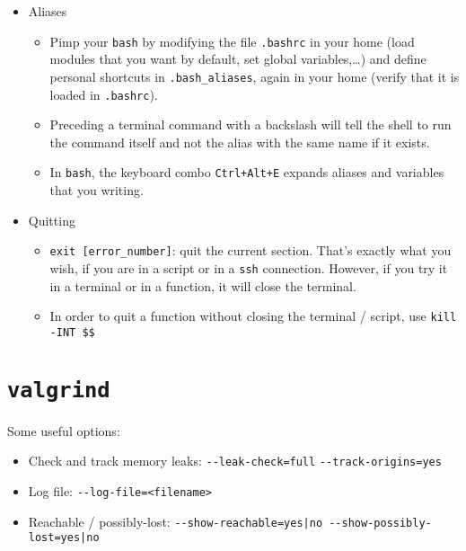 \documentclass[a4paper,12pt,%
              final%
              ]{article}
\begin{document}
\begin{itemize}
\begin{itemize}
\begin{itemize}
        \end{itemize}
    \end{itemize}
  \item Aliases
    \begin{itemize}
      \item Pimp your \texttt{bash} by modifying the file \texttt{.bashrc} in your home (load modules that you want by default, set global variables,\ldots) and define personal shortcuts in \texttt{.bash\_aliases}, again in your home (verify that it is loaded in \texttt{.bashrc}).
      \item Preceding a terminal command with a backslash will tell the shell to run the command itself and not the alias with the same name if it exists.
      \item In \texttt{bash}, the keyboard combo \texttt{Ctrl+Alt+E} expands aliases and variables that you writing.
    \end{itemize}
  \item Quitting
    \begin{itemize}
      \item \verb|exit [error_number]|: quit the current section. That's exactly what you wish, if you are in a script or in a \texttt{ssh} connection. However, if you try it in a terminal or in a function, it will close the terminal.
      \item In order to quit a function without closing the terminal / script, use \verb|kill -INT $$|
    \end{itemize}
\end{itemize}

\section{\texttt{valgrind}}
Some useful options:
\begin{itemize}
  \item Check and track memory leaks: \verb|--leak-check=full| \verb|--track-origins=yes|
  \item Log file: \verb|--log-file=<filename>|
  \item Reachable / possibly-lost: \verb!--show-reachable=yes|no --show-possibly-lost=yes|no!
\end{itemize}

\end{document}
